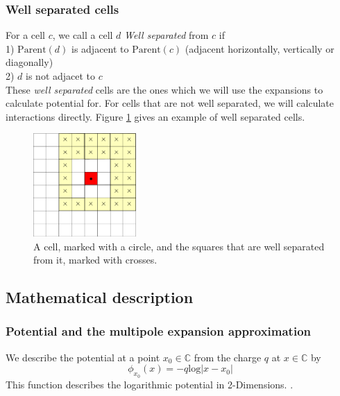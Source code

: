 \documentclass[pdftex,twoside,a4paper]{report}
\newcommand{\bcen}{\begin{center}}
\newcommand{\ecen}{\end{center}}
\begin{document}
\subsubsection{Well separated cells}
\label{sec:well_sep}
For a cell $c$, we call a cell $d$ \emph{Well separated} from $c$ if\\
1) $\text{Parent}(d)$ is adjacent to $\text{Parent}(c)$ (adjacent horizontally, vertically or diagonally)\\
2) $d$ is not adjacet to $c$\\
\newline
These \emph{well separated} cells are the ones which we will use the expansions to calculate potential for. For cells that are not well separated, we will calculate interactions directly. Figure \ref{fig:pme_wellsep} gives an example of well separated cells.
\begin{figure}[h]
\bcen \includegraphics[width=0.35\textwidth]{figures/wellsep.pdf} \ecen
\caption{A cell, marked with a circle, and the squares that are well separated from it, marked with crosses.}
\label{fig:pme_wellsep}
\end{figure}

\subsection{Mathematical description}
\label{sec:fma_math}
\subsubsection{Potential and the multipole expansion approximation}
We describe the potential at a point $x_0 \in \mathbb{C}$ from the charge $q$ at $x \in \mathbb{C}$ by
\begin{equation}
\phi_{x_0}(x) = -q\text{log}{|x - x_0|}
\label{eq:potential}
\end{equation}
This function describes the logarithmic potential in 2-Dimensions. \cite{greengard:315} \cite{samaj}.\\
\end{document}
